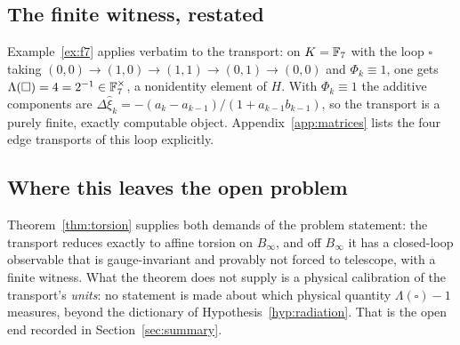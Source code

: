 \subsection{The finite witness, restated}

Example~\ref{ex:f7} applies verbatim to the transport: on
$K=\mathbb{F}_7$ with the loop $\square$ taking
$(0,0)\to(1,0)\to(1,1)\to(0,1)\to(0,0)$ and $\Phi_k\equiv1$, one gets
$\Lambda(\square)=4=2^{-1}\in\mathbb{F}_7^{\times}$, a nonidentity element of
$H$.  With $\Phi_k\equiv1$ the additive components are
$\Delta\hat\xi_k=-(a_k-a_{k-1})/(1+a_{k-1}b_{k-1})$, so the transport is a purely
finite, exactly computable object.  Appendix~\ref{app:matrices} lists the four
edge transports of this loop explicitly.

\subsection{Where this leaves the open problem}

Theorem~\ref{thm:torsion} supplies both demands of the problem statement: the
transport reduces exactly to affine torsion on $B_\infty$, and off $B_\infty$ it
has a closed-loop observable that is gauge-invariant and provably not forced to
telescope, with a finite witness.  What the theorem does not supply is a
physical calibration of the transport's \emph{units}: no statement is made about
which physical quantity $\Lambda(\square)-1$ measures, beyond the dictionary of
Hypothesis~\ref{hyp:radiation}.  That is the open end recorded in
Section~\ref{sec:summary}.
